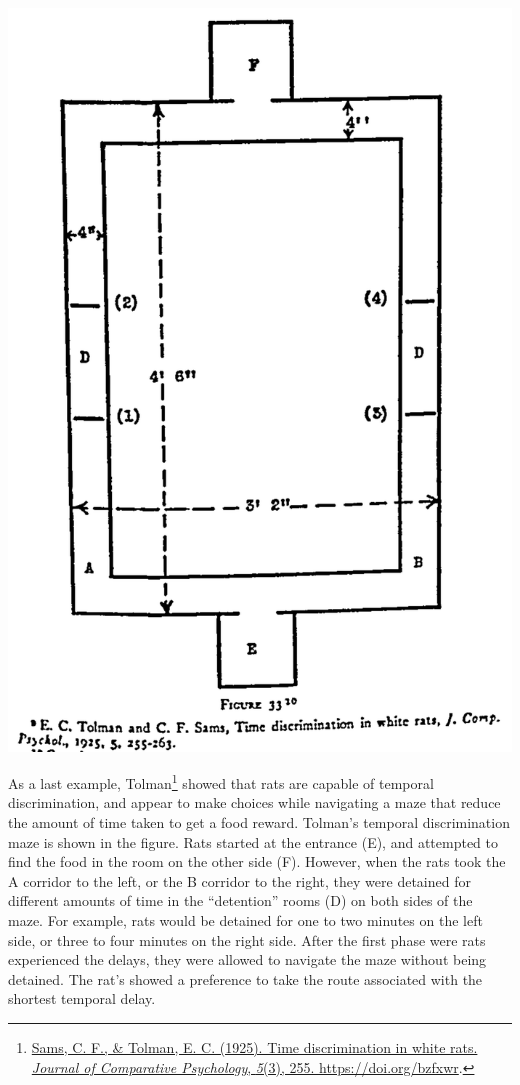 \documentclass[
  oneside,
  12pt]{crumpbook}
\newenvironment{floatrightbox50}{%
  \wrapfigure{R}{.5\textwidth}%
  }{%
  \endwrapfigure}
\begin{document}
\begin{floatrightbox50}
\includegraphics[width=1\linewidth]{imgs/Tolman_Temporal}

\end{floatrightbox50}

As a last example, Tolman\footnote{\protect\hyperlink{ref-samsTimeDiscriminationWhite1925}{Sams, C. F., \& Tolman, E. C. (1925). Time discrimination in white rats. \emph{Journal of Comparative Psychology}, \emph{5}(3), 255. \url{https://doi.org/bzfxwr}}.} showed that rats are capable of temporal discrimination, and appear to make choices while navigating a maze that reduce the amount of time taken to get a food reward. Tolman's temporal discrimination maze is shown in the figure. Rats started at the entrance (E), and attempted to find the food in the room on the other side (F). However, when the rats took the A corridor to the left, or the B corridor to the right, they were detained for different amounts of time in the ``detention'' rooms (D) on both sides of the maze. For example, rats would be detained for one to two minutes on the left side, or three to four minutes on the right side. After the first phase were rats experienced the delays, they were allowed to navigate the maze without being detained. The rat's showed a preference to take the route associated with the shortest temporal delay.
\end{document}
